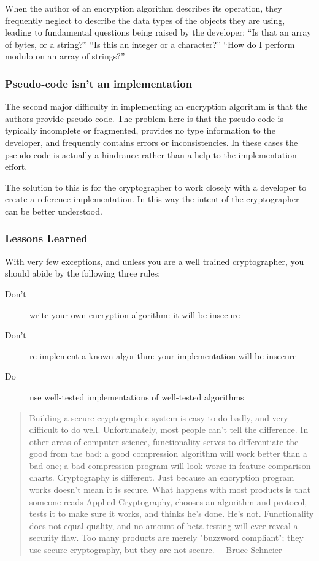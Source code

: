 When the author of an encryption algorithm describes its operation, they frequently neglect to describe the data types of the objects they are using, leading to fundamental questions being raised by the developer: 
\enquote{Is that an array of bytes, or a string?}
\enquote{Is this an integer or a character?}
\enquote{How do I perform modulo on an array of strings?}

\subsubsection{Pseudo-code isn't an implementation}
The second major difficulty in implementing an encryption algorithm is that the authors provide pseudo-code. The problem here is that the pseudo-code is typically incomplete or fragmented, provides no type information to the developer, and frequently contains errors or inconsistencies. In these cases the pseudo-code is actually a hindrance rather than a help to the implementation effort.

The solution to this is for the cryptographer to work closely with a developer to create a reference implementation. In this way the intent of the cryptographer can be better understood.

\subsubsection{Lessons Learned}

With very few exceptions, and unless you are a well trained cryptographer, you should abide by the following three rules:

\begin{description}
\item[Don't] write your own encryption algorithm: it will be insecure
\item[Don't] re-implement a known algorithm: your implementation will be insecure
\item [Do] use well-tested implementations of well-tested algorithms
\end{description}

\blockquote[\cite{Schneier:Pitfalls}]{Building a secure cryptographic system is easy to do badly, and very difficult to do well. Unfortunately, most people can't tell the difference. In other areas of computer science, functionality serves to differentiate the good from the bad: a good compression algorithm will work better than a bad one; a bad compression program will look worse in feature-comparison charts. Cryptography is different. Just because an encryption program works doesn't mean it is secure. What happens with most products is that someone reads Applied Cryptography, chooses an algorithm and protocol, tests it to make sure it works, and thinks he's done. He's not. Functionality does not equal quality, and no amount of beta testing will ever reveal a security flaw. Too many products are merely "buzzword compliant"; they use secure cryptography, but they are not secure. ---Bruce Schneier}


